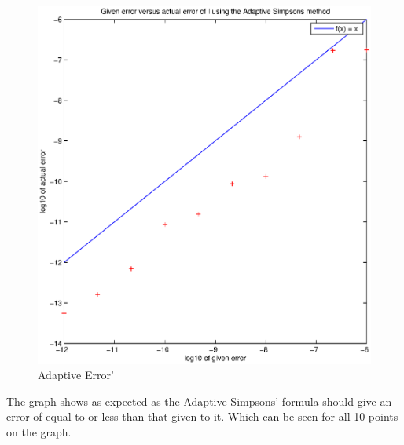 \documentclass[fleqn]{report}
\begin{document}
\begin{figure}[h!]
\begin{center}
    \centerline{\includegraphics[width=1.4\textwidth]{graphs/q8.eps}}
    \caption{Adaptive Error'}
\end{center}
\end{figure}

The graph shows as expected as the Adaptive Simpsons' formula should give an error of equal to
or less than that given to it. Which can be seen for all 10 points on the graph. 
\end{document}
